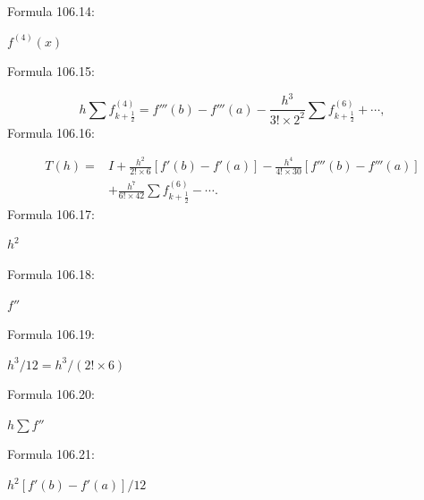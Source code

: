 \documentclass[11pt]{article}
\begin{document}
\noindent Formula 106.14:\par
$f^{(4)}(x)$\par
\noindent Formula 106.15:\par
\[
h\sum f^{(4)}_{k+\frac12}=f'''(b)-f'''(a)
-\frac{h^3}{3!\times2^2}\sum f^{(6)}_{k+\frac12}+\cdots,
\]
\noindent Formula 106.16:\par
\[
\begin{aligned}
T(h)={}&I+\frac{h^2}{2!\times6}[f'(b)-f'(a)]
-\frac{h^4}{4!\times30}[f'''(b)-f'''(a)]\\
&+\frac{h^7}{6!\times42}\sum f^{(6)}_{k+\frac12}-\cdots.
\end{aligned}
\tag{4.3.18}
\]
\noindent Formula 106.17:\par
$h^2$\par
\noindent Formula 106.18:\par
$f''$\par
\noindent Formula 106.19:\par
$h^3/12=h^3/(2!\times6)$\par
\noindent Formula 106.20:\par
$h\sum f''$\par
\noindent Formula 106.21:\par
$h^2[f'(b)-f'(a)]/12$\par
\clearpage
\end{document}
